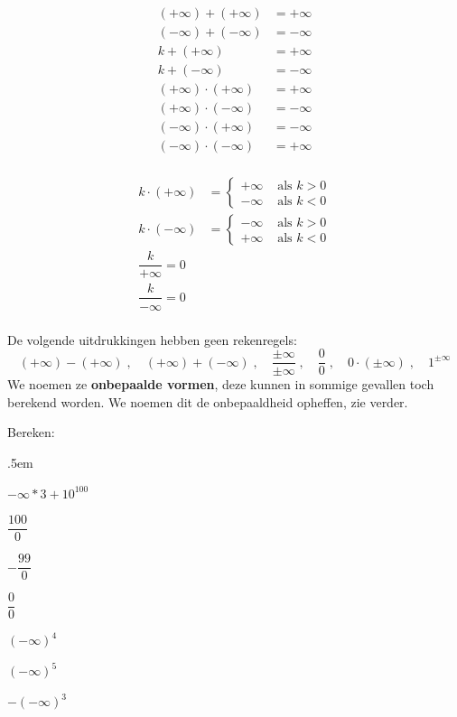 \documentclass[12pt,twoside,a4paper]{article}
\begin{document}
\begin{multicols}{2}
  \begin{align*}
    (+\infty)+(+\infty) &= +\infty\\
    (-\infty)+(-\infty) &= -\infty\\
    k+(+\infty)&=+\infty\\
    k+(-\infty)&=-\infty\\
    (+\infty)\cdot(+\infty) &= +\infty\\
    (+\infty)\cdot(-\infty) &= -\infty\\
    (-\infty)\cdot(+\infty) &= -\infty\\
    (-\infty)\cdot(-\infty) &= +\infty\\
  \end{align*}

  \begin{align*}
    k\cdot(+\infty)&=\begin{cases}+\infty & \mbox{ als } k>0\\-\infty & \mbox{ als } k<0\end{cases}\\
    k\cdot(-\infty)&=\begin{cases}-\infty & \mbox{ als } k>0\\+\infty & \mbox{ als } k<0\end{cases}\\
    \dfrac{k}{+\infty}=0\\
    \dfrac{k}{-\infty}=0\\
  \end{align*}
\end{multicols}

De volgende uitdrukkingen hebben geen rekenregels:
$$(+\infty)-(+\infty)\;,\quad(+\infty)+(-\infty)\;,\quad\dfrac{\pm\infty}{\pm\infty}\;,\quad\dfrac{0}{0}\;,\quad 0\cdot(\pm\infty)\;,\quad 1^{\pm\infty}$$
We noemen ze {\bf onbepaalde vormen}, deze kunnen in sommige gevallen
toch berekend worden. We noemen dit de onbepaaldheid opheffen, zie
verder.

\begin{oefening}
Bereken:
\begin{exlist}{2}
  \itemsep.5em
  \item $-\infty*3+10^{100}$
  \item $\dfrac{100}{0}$
  \item $-\dfrac{99}{0}$
  \item $\dfrac{0}{0}$
  \item $(-\infty)^4$
  \item $(-\infty)^5$
  \item $-(-\infty)^3$
\end{exlist}
\end{oefening}
\end{document}
